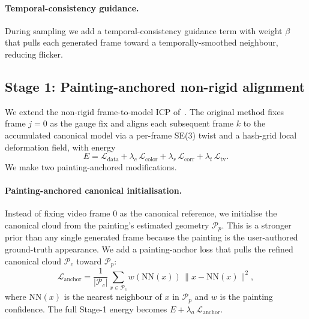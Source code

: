 \documentclass[10pt,twocolumn,letterpaper]{article}
\begin{document}
\paragraph{Temporal-consistency guidance.}
During sampling we add a temporal-consistency guidance term with weight
$\beta$ that pulls each generated frame toward a temporally-smoothed
neighbour, reducing flicker.

\subsection{Stage 1: Painting-anchored non-rigid alignment}
\label{sec:stage1}

We extend the non-rigid frame-to-model ICP
of~\cite{hoellein2026worldreconstruction}. The original method fixes frame
$j{=}0$ as the gauge fix and aligns each subsequent frame $k$ to the
accumulated canonical model via a per-frame SE(3) twist and a hash-grid local
deformation field, with energy
\begin{equation}
E = \mathcal{L}_\text{data} + \lambda_c\, \mathcal{L}_\text{color}
+ \lambda_r\, \mathcal{L}_\text{corr} + \lambda_t\, \mathcal{L}_\text{tv}.
\label{eq:icp}
\end{equation}
We make two painting-anchored modifications.

\paragraph{Painting-anchored canonical initialisation.}
Instead of fixing video frame $0$ as the canonical reference, we initialise
the canonical cloud from the painting's estimated geometry $\mathcal{P}_p$.
This is a stronger prior than any single generated frame because the painting
is the user-authored ground-truth appearance. We add a painting-anchor loss
that pulls the refined canonical cloud $\mathcal{P}_c$ toward $\mathcal{P}_p$:
\begin{equation}
\mathcal{L}_\text{anchor} = \frac{1}{|\mathcal{P}_c|}\sum_{x \in \mathcal{P}_c}
w(\mathrm{NN}(x))\, \|x - \mathrm{NN}(x)\|^2,
\end{equation}
where $\mathrm{NN}(x)$ is the nearest neighbour of $x$ in $\mathcal{P}_p$ and
$w$ is the painting confidence. The full Stage-1 energy becomes
$E + \lambda_a\, \mathcal{L}_\text{anchor}$.
\end{document}
